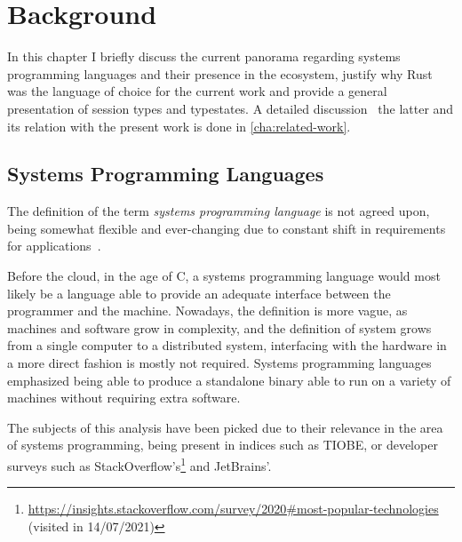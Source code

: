 

\chapter{Background}\label{cha:background}

In this chapter I briefly discuss the current panorama regarding systems programming languages and their presence in the ecosystem,
justify why Rust was the language of choice for the current work and
provide a general presentation of session types and typestates.
A detailed discussion \wrt~the latter and its relation with the present work is done in \autoref{cha:related-work}.

\section{Systems Programming Languages}\label{sec:systems-programming}

The definition of the term \emph{systems programming language} is not agreed upon,
being somewhat flexible and ever-changing due to constant shift in requirements for applications~\autocite{Torre2014}.

Before the cloud, in the age of C, a systems programming language would
most likely be a language able to provide an adequate interface between the programmer and the machine.
Nowadays, the definition is more vague, as machines and software grow in complexity,
and the definition of system grows from a single computer to a distributed system,
interfacing with the hardware in a more direct fashion is mostly not required.
Systems programming languages emphasized being able to produce a standalone
binary able to run on a variety of machines without requiring extra software.

The subjects of this analysis have been picked due to their relevance in the area of systems programming,
being present in indices such as TIOBE,
or developer surveys such as StackOverflow's\footnote{\url{https://insights.stackoverflow.com/survey/2020\#most-popular-technologies}\\(visited in 14/07/2021)} and
JetBrains'.

